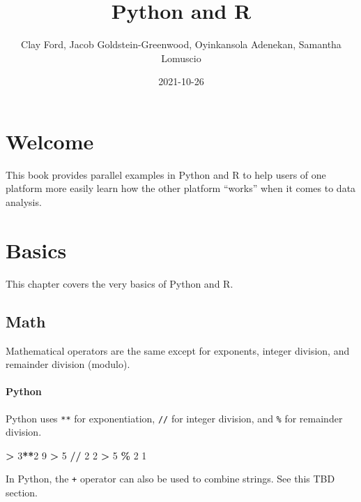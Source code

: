 \documentclass[
]{book}
\title{Python and R}
\author{Clay Ford, Jacob Goldstein-Greenwood, Oyinkansola Adenekan, Samantha Lomuscio}
\date{2021-10-26}
\newenvironment{Shaded}{\begin{snugshade}}{\end{snugshade}}
\newcommand{\DecValTok}[1]{\textcolor[rgb]{0.00,0.00,0.81}{#1}}
\newcommand{\OperatorTok}[1]{\textcolor[rgb]{0.81,0.36,0.00}{\textbf{#1}}}
\begin{document}
\maketitle

{
\setcounter{tocdepth}{1}
\tableofcontents
}
\hypertarget{welcome}{%
\chapter*{Welcome}\label{welcome}}

This book provides parallel examples in Python and R to help users of one platform more easily learn how the other platform ``works'' when it comes to data analysis.

\hypertarget{basics}{%
\chapter{Basics}\label{basics}}

This chapter covers the very basics of Python and R.

\hypertarget{math}{%
\section{Math}\label{math}}

Mathematical operators are the same except for exponents, integer division, and remainder division (modulo).

\hypertarget{python}{%
\subsubsection*{Python}\label{python}}

Python uses \texttt{**} for exponentiation, \texttt{//} for integer division, and \texttt{\%} for remainder division.

\begin{Shaded}
\begin{Highlighting}[]
\OperatorTok{\textgreater{}} \DecValTok{3}\OperatorTok{**}\DecValTok{2}
\DecValTok{9}
\OperatorTok{\textgreater{}} \DecValTok{5} \OperatorTok{//} \DecValTok{2}
\DecValTok{2}
\OperatorTok{\textgreater{}} \DecValTok{5} \OperatorTok{\%} \DecValTok{2}
\DecValTok{1}
\end{Highlighting}
\end{Shaded}

In Python, the \texttt{+} operator can also be used to combine strings. See this TBD section.
\end{document}
